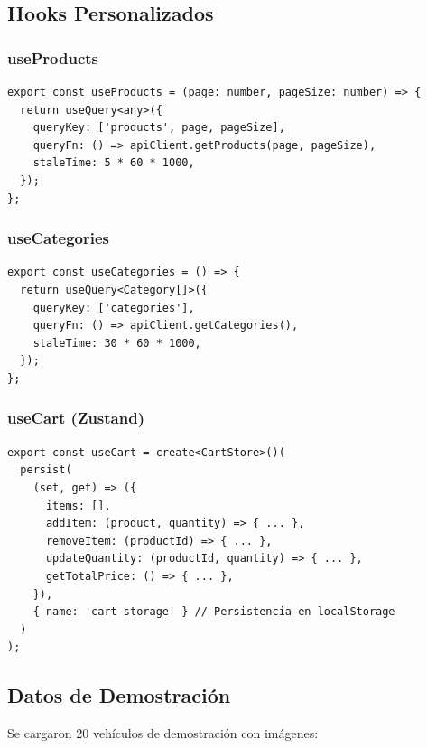 \documentclass[12pt,a4paper]{article}
\begin{document}
\subsection{Hooks Personalizados}

\subsubsection{useProducts}

\begin{lstlisting}
export const useProducts = (page: number, pageSize: number) => {
  return useQuery<any>({
    queryKey: ['products', page, pageSize],
    queryFn: () => apiClient.getProducts(page, pageSize),
    staleTime: 5 * 60 * 1000,
  });
};
\end{lstlisting}

\subsubsection{useCategories}

\begin{lstlisting}
export const useCategories = () => {
  return useQuery<Category[]>({
    queryKey: ['categories'],
    queryFn: () => apiClient.getCategories(),
    staleTime: 30 * 60 * 1000,
  });
};
\end{lstlisting}

\subsubsection{useCart (Zustand)}

\begin{lstlisting}
export const useCart = create<CartStore>()(
  persist(
    (set, get) => ({
      items: [],
      addItem: (product, quantity) => { ... },
      removeItem: (productId) => { ... },
      updateQuantity: (productId, quantity) => { ... },
      getTotalPrice: () => { ... },
    }),
    { name: 'cart-storage' } // Persistencia en localStorage
  )
);
\end{lstlisting}

\subsection{Datos de Demostración}

Se cargaron 20 vehículos de demostración con imágenes:
\end{document}
